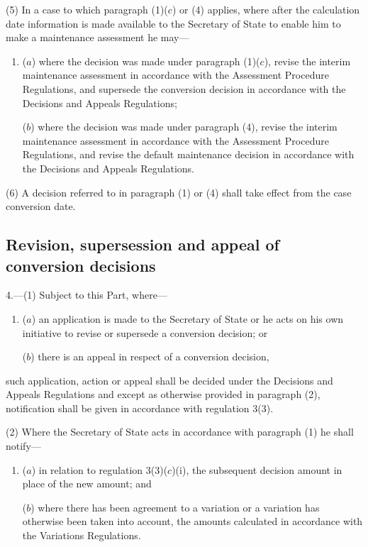 \documentclass[12pt,a4paper]{article}
\begin{document}
(5) In a case to which paragraph (1)($c$)  or (4) applies, where after the calculation date information is made available to the Secretary of State to enable him to make a maintenance assessment he may—
\begin{enumerate}\item[]
($a$) where the decision was made under paragraph (1)($c$), revise the interim maintenance assessment in accordance with the Assessment Procedure Regulations, and supersede the conversion decision in accordance with the Decisions and Appeals Regulations;

($b$) where the decision was made under paragraph (4), revise the interim maintenance assessment in accordance with the Assessment Procedure Regulations, and revise the default maintenance decision in accordance with the Decisions and Appeals Regulations.
\end{enumerate}

(6) A decision referred to in paragraph (1) or (4) shall take effect from the case conversion date.


\subsection[4. Revision, supersession and appeal of conversion decisions]{Revision, supersession and appeal of conversion decisions}

4.---(1)  Subject to this Part, where—
\begin{enumerate}\item[]
($a$) an application is made to the Secretary of State or he acts on his own initiative to revise or supersede a conversion decision; or

($b$) there is an appeal in respect of a conversion decision,
\end{enumerate}
such application, action or appeal shall be decided under the Decisions and Appeals Regulations and except as otherwise provided in paragraph (2), notification shall be given in accordance with regulation 3(3).

(2) Where the Secretary of State acts in accordance with paragraph (1) he shall notify—
\begin{enumerate}\item[]
($a$) in relation to regulation 3(3)($c$)(i), the subsequent decision amount in place of the new amount; and

($b$) where there has been agreement to a variation or a variation has otherwise been taken into account, the amounts calculated in accordance with the Variations Regulations.
\end{enumerate}
\end{document}

